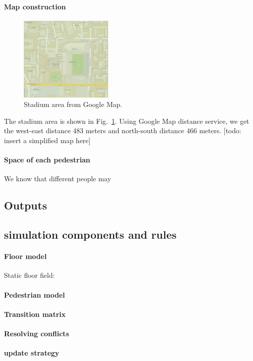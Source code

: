 \documentclass[paper=a4, fontsize=11pt]{article} %
\begin{document}
\paragraph{Map construction}

\begin{figure}[h]
  \centering
  \includegraphics[width=0.4\textwidth]{map}
  \caption{Stadium area from Google Map.}
  \label{fig:map}
\end{figure}

The stadium area is shown in Fig.~\ref{fig:map}. Using Google Map distance
service, we get the west-east distance 483 meters and north-south distance
466 meters. [todo: insert a simplified map here]


\paragraph{Space of each pedestrian} We know that different people may

\subsection{Outputs}

\subsection{simulation components and rules}

\paragraph{Floor model}
Static floor field: 


\paragraph{Pedestrian model}

\paragraph{Transition matrix}

\paragraph{Resolving conflicts}

\paragraph{update strategy}

\end{document}
